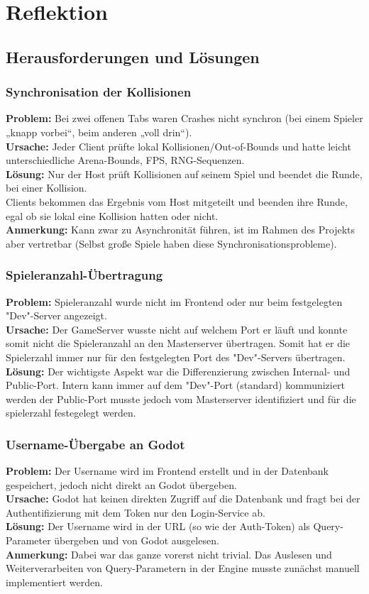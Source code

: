 \chapter{Reflektion}
\section{Herausforderungen und Lösungen}
\subsection*{Synchronisation der Kollisionen}
\textbf{Problem:} Bei zwei offenen Tabs waren Crashes nicht synchron (bei einem Spieler „knapp vorbei“, beim anderen „voll drin“). \\
\textbf{Ursache:} Jeder Client prüfte lokal Kollisionen/Out-of-Bounds und hatte leicht unterschiedliche Arena-Bounds, FPS, RNG-Sequenzen.\\
\textbf{Lösung:} Nur der Host prüft Kollisionen auf seinem Spiel und beendet die Runde, bei einer Kollision. \\
Clients bekommen das Ergebnis vom Host mitgeteilt und beenden ihre Runde, egal ob sie lokal eine Kollision hatten oder nicht.\\
\textbf{Anmerkung:} Kann zwar zu Asynchronität führen, ist im Rahmen des Projekts aber vertretbar (Selbst große Spiele haben diese Synchronisationsprobleme).

\subsection*{Spieleranzahl-Übertragung}
\textbf{Problem:} Spieleranzahl wurde nicht im Frontend oder nur beim festgelegten "Dev"-Server angezeigt.\\
\textbf{Ursache:} Der GameServer wusste nicht auf welchem Port er läuft und konnte somit nicht die Spieleranzahl an den Masterserver übertragen. Somit hat er die Spielerzahl immer nur für den festgelegten Port des "Dev"-Servers übertragen.\\
\textbf{Lösung:} Der wichtigste Aspekt war die Differenzierung zwischen Internal- und Public-Port. Intern kann immer auf dem "Dev"-Port (standard) kommuniziert werden der Public-Port musste jedoch vom Masterserver identifiziert und für die spielerzahl festegelegt werden. \\

\subsection*{Username-Übergabe an Godot}
\textbf{Problem:} Der Username wird im Frontend erstellt und in der Datenbank gespeichert, jedoch nicht direkt an Godot übergeben.\\
\textbf{Ursache:} Godot hat keinen direkten Zugriff auf die Datenbank und fragt bei der Authentifizierung mit dem Token nur den Login-Service ab.\\
\textbf{Lösung:} Der Username wird in der URL (so wie der Auth-Token) als Query-Parameter übergeben und von Godot ausgelesen.\\
\textbf{Anmerkung:} Dabei war das ganze vorerst nicht trivial. Das Auslesen und Weiterverarbeiten von Query-Parametern in der Engine musste zunächst manuell implementiert werden.


